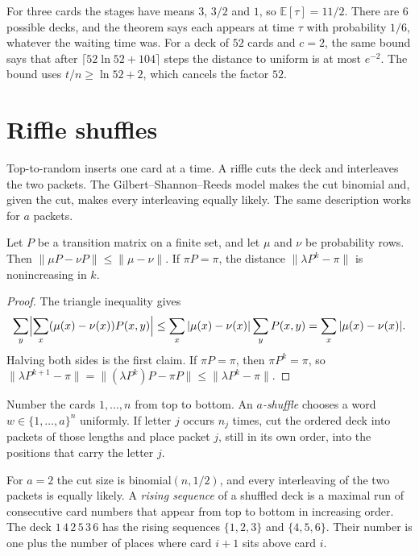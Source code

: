 For three cards the stages have means $3$, $3/2$ and $1$, so $\mathbb E[\tau]=11/2$. There are $6$ possible decks, and the theorem says each appears at time $\tau$ with probability $1/6$, whatever the waiting time was. For a deck of $52$ cards and $c=2$, the same bound says that after $\lceil 52\ln 52+104\rceil$ steps the distance to uniform is at most $e^{-2}$. The bound uses $t/n\ge\ln 52+2$, which cancels the factor $52$.

\section{Riffle shuffles}

Top-to-random inserts one card at a time. A riffle cuts the deck and interleaves the two packets. The Gilbert--Shannon--Reeds model makes the cut binomial and, given the cut, makes every interleaving equally likely. The same description works for $a$ packets.

\begin{lemma}\label{lem:tvcontract}
Let $P$ be a transition matrix on a finite set, and let $\mu$ and $\nu$ be probability rows. Then $\|\mu P-\nu P\|\le\|\mu-\nu\|$. If $\pi P=\pi$, the distance $\|\lambda P^k-\pi\|$ is nonincreasing in $k$.
\end{lemma}
\begin{proof}
The triangle inequality gives
\[
 \sum_y\Bigl|\sum_x(\mu(x)-\nu(x))P(x,y)\Bigr|
 \le\sum_x|\mu(x)-\nu(x)|\sum_y P(x,y)
 =\sum_x|\mu(x)-\nu(x)|.
\]
Halving both sides is the first claim. If $\pi P=\pi$, then $\pi P^k=\pi$, so $\|\lambda P^{k+1}-\pi\|=\|(\lambda P^k)P-\pi P\|\le\|\lambda P^k-\pi\|$.
\end{proof}

\begin{definition}[$a$-shuffle]\label{def:ashuffle}
Number the cards $1,\ldots,n$ from top to bottom. An \emph{$a$-shuffle} chooses a word $w\in\{1,\ldots,a\}^n$ uniformly. If letter $j$ occurs $n_j$ times, cut the ordered deck into packets of those lengths and place packet $j$, still in its own order, into the positions that carry the letter $j$.
\end{definition}

For $a=2$ the cut size is binomial$(n,1/2)$, and every interleaving of the two packets is equally likely. A \emph{rising sequence} of a shuffled deck is a maximal run of consecutive card numbers that appear from top to bottom in increasing order. The deck $1\,4\,2\,5\,3\,6$ has the rising sequences $\{1,2,3\}$ and $\{4,5,6\}$. Their number is one plus the number of places where card $i+1$ sits above card $i$.

